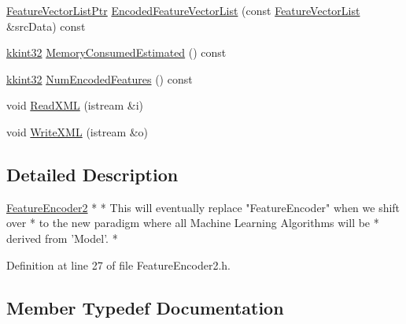 \begin{DoxyCompactItemize}
\item 
\hyperlink{namespace_k_k_m_l_l_acf2ba92a3cf03e2b19674b24ff488ef6}{Feature\+Vector\+List\+Ptr} \hyperlink{class_k_k_m_l_l_1_1_feature_encoder2_aa72d55374e2be4e2e21ae8a67fa750c0}{Encoded\+Feature\+Vector\+List} (const \hyperlink{class_k_k_m_l_l_1_1_feature_vector_list}{Feature\+Vector\+List} \&src\+Data) const 
\item 
\hyperlink{namespace_k_k_b_a8fa4952cc84fda1de4bec1fbdd8d5b1b}{kkint32} \hyperlink{class_k_k_m_l_l_1_1_feature_encoder2_a63b9cbe0310a4bdf12989a71897fd555}{Memory\+Consumed\+Estimated} () const 
\item 
\hyperlink{namespace_k_k_b_a8fa4952cc84fda1de4bec1fbdd8d5b1b}{kkint32} \hyperlink{class_k_k_m_l_l_1_1_feature_encoder2_a7a8de2fab0082636b80b61274b023c23}{Num\+Encoded\+Features} () const 
\item 
void \hyperlink{class_k_k_m_l_l_1_1_feature_encoder2_a604d0345f33e6536dfd8a4e50eac4d16}{Read\+X\+ML} (istream \&i)
\item 
void \hyperlink{class_k_k_m_l_l_1_1_feature_encoder2_a3e8ddf756bc58f5e95f82ff470325766}{Write\+X\+ML} (istream \&o)
\end{DoxyCompactItemize}


\subsection{Detailed Description}

\begin{DoxyCode}
                     \hyperlink{class_k_k_m_l_l_1_1_feature_encoder2_a963351c535276de1fa40d992a327415c}{FeatureEncoder2}                               *
                                                                   *
This will eventually replace \textcolor{stringliteral}{"FeatureEncoder"} when we shift over   *
to the \textcolor{keyword}{new} paradigm where all Machine Learning Algorithms will be  *
derived from \textcolor{stringliteral}{'Model'}.                                              *
\end{DoxyCode}
 

Definition at line 27 of file Feature\+Encoder2.\+h.



\subsection{Member Typedef Documentation}
